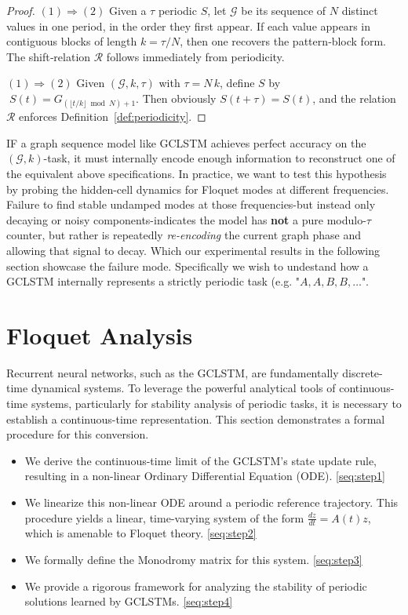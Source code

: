 \documentclass{article}
\theoremstyle{remark}
\theoremstyle{definition}
\newcommand{\dpt}[1]{\frac{d#1}{dt}} %
\begin{document}
\begin{proof}
    \emph{$(1)\Rightarrow (2)$} Given a $\tau$ periodic $S$, let \(\mathcal{G}\) be its sequence of \(N\) distinct values in one period, in the order they first appear.  If each value appears in contiguous blocks of length \(k=\tau/N\), then one recovers the pattern‐block form.  The shift‐relation \(\mathcal{R}\) follows immediately from periodicity.

    \emph{$(1)\Rightarrow (2)$}
    Given \((\mathcal{G},k,\tau)\) with \(\tau=N\,k\), define \(S\) by \(\;S(t)=G_{(\lfloor t/k\rfloor\bmod N)+1}\).  Then obviously \(S(t+\tau)=S(t)\), and the relation \(\mathcal{R}\) enforces Definition~\ref{def:periodicity}.
\end{proof}

IF a graph sequence model like GCLSTM achieves perfect accuracy on the $(\mathcal{G}, k)$-task, it must internally encode enough information to reconstruct one of the equivalent above specifications. In practice, we want to test this hypothesis by probing the hidden-cell dynamics for Floquet modes at different frequencies. Failure to find stable undamped modes at those frequencies-but instead only decaying or noisy components-indicates the model has \textbf{not} a pure modulo-$\tau$ counter, but rather is repeatedly \emph{re-encoding} the current graph phase and allowing that signal to decay. Which our experimental results in the following section showcase the failure mode. Specifically we wish to undestand how a GCLSTM internally represents a strictly periodic task (e.g. "$A,A,B,B, \dots$". 





\section{Floquet Analysis}


Recurrent neural networks, such as the GCLSTM, are fundamentally discrete-time dynamical systems. To leverage the powerful analytical tools of continuous-time systems, particularly for stability analysis of periodic tasks, it is necessary to establish a continuous-time representation. This section demonstrates a formal procedure for this conversion. 

\begin{itemize}
    \item We derive the continuous-time limit of the GCLSTM's state update rule, resulting in a non-linear Ordinary Differential Equation (ODE). \ref{seq:step1}
    \item We linearize this non-linear ODE around a periodic reference trajectory. This procedure yields a linear, time-varying system of the form $\dpt{z} = A(t)z$, which is amenable to Floquet theory. \ref{seq:step2}
    \item We formally define the Monodromy matrix for this system. \ref{seq:step3} 
    \item We provide a rigorous framework for analyzing the stability of periodic solutions learned by GCLSTMs. \ref{seq:step4}
\end{itemize}
\end{document}

